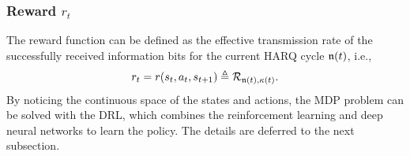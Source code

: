 \documentclass[lettersize,journal]{IEEEtran}
\begin{document}
\subsubsection{Reward $r_t$} %
    The reward function can be defined as the effective transmission rate of the successfully received information bits for the current HARQ cycle $\frak{n}(t)$, i.e.,
    \begin{equation}\label{eqn:reward}
    {r_t} = r({s_t},{a_t},{s_{t+1}}) \triangleq  {{\mathcal R_{\frak{n}(t),\kappa(t)}}}.
    \end{equation}
    By noticing the continuous space of the states and actions, the MDP problem can be solved with the DRL, which combines the reinforcement learning and deep neural networks to learn the policy. The details are deferred to the next subsection.
\end{document}

